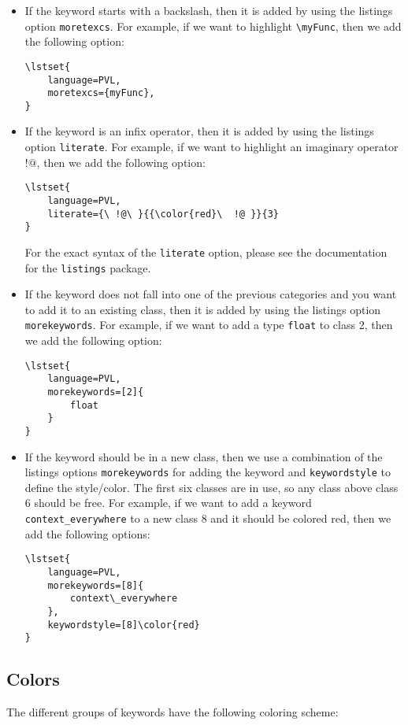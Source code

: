 \documentclass[a4paper]{scrartcl}
\begin{document}
\begin{itemize}
	\item If the keyword starts with a backslash, then it is added by using the listings option \texttt{moretexcs}. For example, if we want to highlight \texttt{\textbackslash myFunc}, then we add the following option:
		\begin{verbatim}
\lstset{
    language=PVL,
    moretexcs={myFunc},
}
		\end{verbatim}
	\item If the keyword is an infix operator, then it is added by using the listings option \texttt{literate}. For example, if we want to highlight an imaginary operator $!@$, then we add the following option:
		\begin{verbatim}
\lstset{
    language=PVL,
    literate={\ !@\ }{{\color{red}\  !@ }}{3}
}
		\end{verbatim}
	For the exact syntax of the \texttt{literate} option, please see the documentation for the \texttt{listings} package.

	\item If the keyword does not fall into one of the previous categories and you want to add it to an existing class, then it is added by using the listings option \texttt{morekeywords}. For example, if we want to add a type \texttt{float} to class 2, then we add the following option:
	\begin{verbatim}
\lstset{
    language=PVL,
    morekeywords=[2]{
        float
    }
}
	\end{verbatim}
	
	\item If the keyword should be in a new class, then we use a combination of the listings options \texttt{morekeywords} for adding the keyword and \texttt{keywordstyle} to define the style/color. The first six classes are in use, so any class above class 6 should be free. For example, if we want to add a keyword \texttt{context\_everywhere} to a new class 8 and it should be colored \color{red}red\color{black}, then we add the following options:
	
	\begin{verbatim}
\lstset{
    language=PVL,
    morekeywords=[8]{
        context\_everywhere
    },
    keywordstyle=[8]\color{red}
}
\end{verbatim}
\end{itemize}


\subsection{Colors}
The different groups of keywords have the following coloring scheme:
\end{document}
